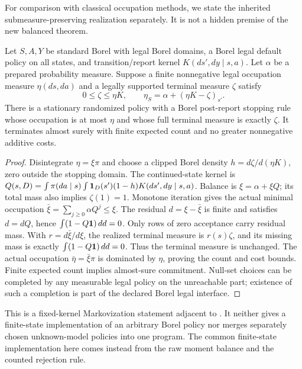For comparison with classical occupation methods, we state the inherited submeasure-preserving realization separately. It is not a hidden premise of the new balanced theorem.

\begin{proposition}\label{prop:flow}
Let $S,A,Y$ be standard Borel with legal Borel domains, a Borel legal default policy on all states, and transition/report kernel $K(ds',dy\mid s,a)$. Let $\alpha$ be a prepared probability measure. Suppose a finite nonnegative legal occupation measure $\eta(ds,da)$ and a legally supported terminal measure $\zeta$ satisfy
\[
 0\le\zeta\le\eta K,\qquad
 \eta_S=\alpha+(\eta K-\zeta)_{s'}.
\]
There is a stationary randomized policy with a Borel post-report stopping rule whose occupation is at most $\eta$ and whose full terminal measure is exactly $\zeta$. It terminates almost surely with finite expected count and no greater nonnegative additive costs.
\end{proposition}
\begin{proof}
Disintegrate $\eta=\xi\pi$ and choose a clipped Borel density $h=d\zeta/d(\eta K)$, zero outside the stopping domain. The continued-state kernel is
$Q(s,D)=\int\pi(da\mid s)\int\mathbf1_D(s')(1-h)K(ds',dy\mid s,a)$.
Balance is $\xi=\alpha+\xi Q$; its total mass also implies $\zeta(1)=1$. Monotone iteration gives the actual minimal occupation $\bar\xi=\sum_{j\ge0}\alpha Q^j\le\xi$. The residual $d=\xi-\bar\xi$ is finite and satisfies $d=dQ$, hence $\int(1-Q\mathbf1)\,dd=0$. Only rows of zero acceptance carry residual mass. With $r=d\bar\xi/d\xi$, the realized terminal measure is $r(s)\zeta$, and its missing mass is exactly $\int(1-Q\mathbf1)\,dd=0$. Thus the terminal measure is unchanged. The actual occupation $\bar\eta=\bar\xi\pi$ is dominated by $\eta$, proving the count and cost bounds. Finite expected count implies almost-sure commitment. Null-set choices can be completed by any measurable legal policy on the unreachable part; existence of such a completion is part of the declared Borel legal interface.
\end{proof}

This is a fixed-kernel Markovization statement adjacent to \cite{PZExtreme,PZContinuity,DPAbsorb}. It neither gives a finite-state implementation of an arbitrary Borel policy nor merges separately chosen unknown-model policies into one program. The common finite-state implementation here comes instead from the raw moment balance and the counted rejection rule.
